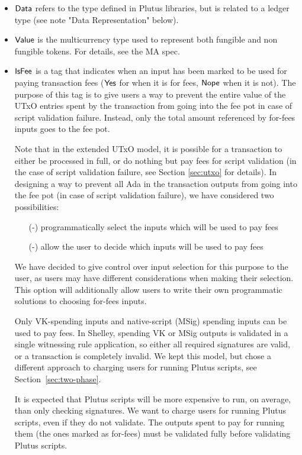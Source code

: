 \begin{itemize}
  \item $\mathsf{Data}$ refers to the type defined in Plutus libraries, but is
  related to a ledger type (see note "Data Representation" below).

  \item $\mathsf{Value}$ is the multicurrency type used to represent
  both fungible and non fungible tokens. For details, see the MA spec.

  \item $\mathsf{IsFee}$ is a tag that indicates when an input has been marked
  to be used for paying transaction fees ($\mathsf{Yes}$ for when it is for fees,
  $\mathsf{Nope}$ when it is not). The purpose of this tag is to give users a way to prevent
  the entire value of the UTxO entries spent by the transaction
  from going into the fee pot in case of script validation failure.
  Instead, only the total amount referenced by for-fees inputs goes
  to the fee pot.

  Note that in the extended UTxO model, it is possible for a transaction
  to either be processed in full, or do nothing but pay fees for script
  validation (in the case of script validation failure, see Section
  \ref{sec:utxo} for details).
  In designing a way to prevent all Ada in the transaction outputs from going into
  the fee pot (in case of script validation failure), we have considered two
  possibilities:

  \begin{itemize}
    \item[(-)] programmatically select the inputs which will be used to pay fees
    \item[(-)] allow the user to decide which inputs will be used to pay fees
  \end{itemize}

  We have decided to give control over input selection for this purpose to the user,
  as users may have different considerations when making their selection. This
  option will additionally allow users to write their own programmatic solutions
  to choosing for-fees inputs.

  Only VK-spending inputs and native-script (MSig) spending inputs can
  be used to pay fees. In Shelley, spending VK or MSig outputs is
  validated in a single witnessing rule application, so either all
  required signatures are valid, or a transaction is completely
  invalid. We kept this model, but chose a different approach to
  charging users for running Plutus scripts, see
  Section~\ref{sec:two-phase}.

  It is expected that Plutus scripts will be more expensive to run, on
  average, than only checking signatures. We want to charge users for
  running Plutus scripts, even if they do not validate. The outputs
  spent to pay for running them (the ones marked as for-fees) must be
  validated fully before validating Plutus scripts.


\end{itemize}
